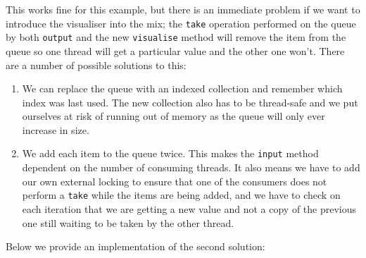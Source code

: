 This works fine for this example, but there is an immediate problem if
we want to introduce the visualiser into the mix; the \texttt{take}
operation performed on the queue by both \texttt{output} and the new
\texttt{visualise} method will remove the item from the queue so one
thread will get a particular value and the other one won't.  There are
a number of possible solutions to this:

\begin{enumerate}
\item We can replace the queue with an indexed collection and remember
  which index was last used.  The new collection also has to be
  thread-safe and we put ourselves at risk of running out of memory as
  the queue will only ever increase in size.
\item We add each item to the queue twice.  This makes the
  \texttt{input} method dependent on the number of consuming threads.
  It also means we have to add our own external locking to ensure that
  one of the consumers does not perform a \texttt{take} while the
  items are being added, and we have to check on each iteration that
  we are getting a new value and not a copy of the previous one still
  waiting to be taken by the other thread.
\end{enumerate}

Below we provide an implementation of the second solution:

